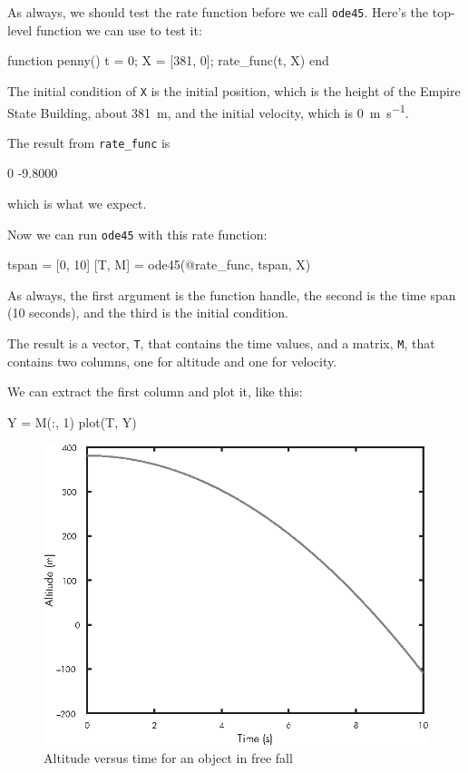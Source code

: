 
As always, we should test the rate function before we call \lstinline{ode45}.  Here's the top-level function we can use to test it:

\begin{code}
function penny()
   t = 0;
   X = [381, 0];
   rate_func(t, X)
end
\end{code}

The initial condition of \lstinline{X} is the initial position, which is the height of the Empire State Building, about \SI{381}{\meter}, and the initial velocity, which is \SI{0}{\meter \per \second}.


The result from \lstinline{rate_func} is

\begin{code}
    0
   -9.8000
\end{code}
which is what we expect.

Now we can run \lstinline{ode45} with this rate function:

\begin{code}
tspan = [0, 10]
[T, M] = ode45(@rate_func, tspan, X)
\end{code}

As always, the first argument is the function handle, the second
is the time span (10 seconds), and the third is the initial
condition.

The result is a vector, \lstinline{T}, that contains the time values, and a matrix, \lstinline{M}, that contains two columns, one for altitude and one for velocity.

We can extract the first column and plot it, like this:

\begin{code}
Y = M(:, 1)
plot(T, Y)
\end{code}


\begin{figure}
\centerline{\includegraphics[scale=0.8]{images/figure11_01_new.eps}}
\caption{Altitude versus time for an object in free fall}
\label{fig:penny}
\end{figure}

